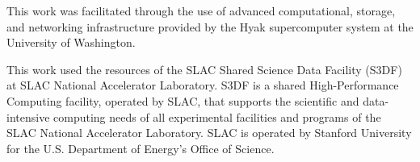 \documentclass[]{aastex631}
\begin{document}
          
{}


\begin{acknowledgments}
This work was facilitated through the use of advanced computational, storage, and networking infrastructure provided by the Hyak supercomputer system at the University of Washington.

This work used the resources of the SLAC Shared Science Data Facility (S3DF) at SLAC National Accelerator Laboratory. S3DF is a shared High-Performance Computing facility, operated by SLAC, that supports the scientific and data-intensive computing needs of all experimental facilities and programs of the SLAC National Accelerator Laboratory. SLAC is operated by Stanford University for the U.S. Department of Energy’s Office of Science.
\end{acknowledgments}
\end{document}
